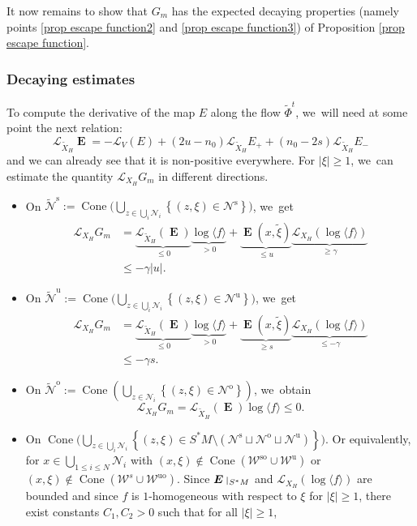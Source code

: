 \documentclass[11pt]{article}
\let\oldbigcup\bigcup
\newcommand{\ro}{\mathrm{o}}
\newcommand{\rs}{\mathrm{s}}
\newcommand{\rso}{\mathrm{so}}
\newcommand{\ru}{\mathrm{u}}
\newcommand{\ruo}{\mathrm{uo}}
\theoremstyle{definition}
\theoremstyle{plain}
\newcommand{\Lie}{\mathcal{L}}
\newcommand{\Ncal}{\mathcal{N}}
\newcommand{\Wcal}{\mathcal{W}}
\newcommand{\w}[1]{\langle {#1} \rangle}
\DeclareMathOperator{\Cone}{Cone}
\DeclareMathOperator{\E}{\boldsymbol{E}}
\def\rest#1#2{\mathchoice
{\setbox1\hbox{${\displaystyle #1}_{\scriptstyle #2}$}
\restrictionaux{#1}{#2}}
{\setbox1\hbox{${\textstyle #1}_{\scriptstyle #2}$}
\restrictionaux{#1}{#2}}
{\setbox1\hbox{${\scriptstyle #1}_{\scriptscriptstyle #2}$}
\restrictionaux{#1}{#2}}
{\setbox1\hbox{${\scriptscriptstyle #1}_{\scriptscriptstyle #2}$}
\restrictionaux{#1}{#2}}}
\def\restrictionaux#1#2{{#1\,\smash{\vrule height.8\ht1 depth.85\dp1}}_{\,#2}}
\begin{document}
It now remains to show that $G_m$ has the expected decaying properties (namely points \eqref{prop escape function2} and \eqref{prop escape function3}) of Proposition \ref{prop escape function}.

\subsubsection*{Decaying estimates}
To compute the derivative of the map $E$ along the flow $\widetilde{\Phi}^t$, we~will need at some point the next relation:
\[
\Lie_{\widetilde{X}_H} \E = - \Lie_V (E) + (2u - n_0) \Lie_{\widetilde{X}_H} E_+ + (n_0 -2s) \Lie_{\widetilde{X}_H} E_-
\]
and we can already see that it is non-positive everywhere. For $|\xi| \geq 1$, we~can estimate the quantity $\Lie_{X_H} G_m$ in different directions.
\begin{itemize}
\item On $\widetilde{\Ncal}^\rs:= \Cone \bigl(\bigcup_{z \in \oldbigcup_i \Ncal_i} \left\{ (z,\xi) \in \Ncal^\rs \right\} \bigr)$, we~get
\begin{align*}
\Lie_{X_H} G_m &= \underbrace{\Lie_{\widetilde{X}_H} (\E)}_{\leq 0} \underbrace{\log \w{f}}_{> 0} + \underbrace{\E (x,\tilde{\xi})}_{\leq u } \underbrace{\Lie_{X_H} (\log \w{f})}_{\geq \gamma} \\
&\leq - \gamma |u|.
\end{align*}
\item On $\widetilde{\Ncal}^\ru:= \Cone \bigl(\bigcup_{z \in \oldbigcup_i \Ncal_i} \left\{ (z,\xi) \in \Ncal^\ru \right\} \bigr)$, we~get
\begin{align*}
\Lie_{X_H} G_m &= \underbrace{\Lie_{\widetilde{X}_H} (\E)}_{\leq 0} \underbrace{\log \w{f}}_{> 0} + \underbrace{\E (x,\tilde{\xi})}_{\geq s} \underbrace{\Lie_{X_H} (\log \w{f})}_{\leq - \gamma} \\
&\leq - \gamma s.
\end{align*}
\item On $\widetilde{\Ncal}^\ro:= \Cone \left(\bigcup_{z \in \Ncal_i} \left\{ (z,\xi) \in \Ncal^\ro \right\}\right)$, we~obtain
\[
\Lie_{X_H} G_m = \Lie_{\widetilde{X}_H} (\E) \log \w{f} \leq 0.
\]
\item On $\Cone \bigl(\bigcup_{z \in \oldbigcup_i \Ncal_i} \left\{ (z,\xi) \in S^* M \setminus \left(\Ncal^\rs \sqcup \Ncal^\ro \sqcup \Ncal^\ru \right) \right\} \bigr)$. Or equivalently, for $x \in \bigcup_{1 \leq i \leq N} \Ncal_i$ with $(x,\xi) \notin \Cone (\Wcal^{\rso}\cup \Wcal^{\ru})$ or $(x,\xi) \notin \Cone (\Wcal^{s}\cup \Wcal^{\ruo})$. Since $\rest{\E}{S^* M}$ and $\Lie_{X_H} (\log \w{f})$ are bounded and since $f$ is $1$-homogeneous with respect to $\xi$ for $|\xi| \geq 1$, there exist constants $C_1, C_2 > 0$ such that for all $|\xi| \geq 1$,

\end{itemize}
\end{document}
